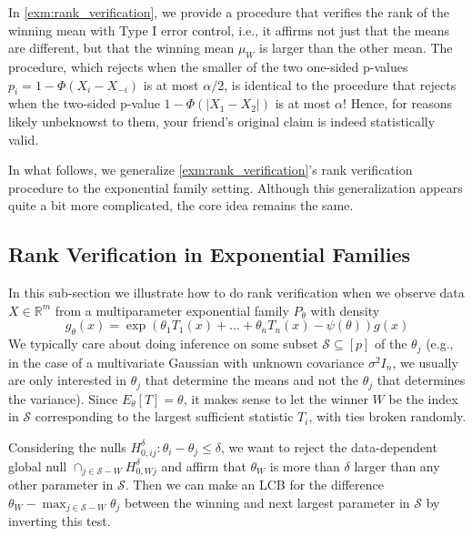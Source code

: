 \documentclass{article}
\newcommand{\R}{\mathbb{R}}
\begin{document}
In \eqref{exm:rank_verification}, we provide a procedure that verifies the rank of the winning mean with Type I error control, i.e., it affirms not just that the means are different, but that the winning mean $\mu_W$ is larger than the other mean.  The procedure, which rejects when the smaller of the two one-sided p-values $p_i = 1 - \Phi(X_i - X_{-i})$ is at most $\alpha/2$, is identical to the procedure that rejects when the two-sided p-value $1 - \Phi(|X_1 - X_2|)$ is at most $\alpha$! Hence, for reasons likely unbeknowst to them, your friend's original claim is indeed statistically valid. 

In what follows, we generalize \eqref{exm:rank_verification}'s rank verification procedure to the exponential family setting. Although this generalization appears quite a bit more complicated, the core idea remains the same. 

\subsection{Rank Verification in Exponential Families}

In this sub-section we illustrate how to do rank verification when we observe data $X \in \R^m$ from a multiparameter exponential family $P_{\theta}$ with density
\begin{equation}
    \label{eq:exp_fam}
    g_{\theta}(x) = \exp(\theta_1 T_1(x) + \dots + \theta_n T_n(x) - \psi(\theta))g(x)
\end{equation}
We typically care about doing inference on some subset $\mathcal{S} \subseteq [p]$ of the $\theta_j$ (e.g., in the case of a multivariate Gaussian with unknown covariance $\sigma^2I_n$, we usually are only interested in $\theta_j$ that determine the means and not the $\theta_j$ that determines the variance). Since $E_{\theta}[T] = \theta$, it makes sense to let the winner $W$ be the index in $\mathcal{S}$ corresponding to the largest sufficient statistic $T_i$, with ties broken randomly.

Considering the nulls $H^{\delta}_{0, ij} : \theta_i - \theta_j \leq \delta $, we want to reject the data-dependent global null $\cap_{j \in \mathcal{S} - W} H^{\delta}_{0, Wj} $ and affirm that $\theta_W$ is more than $\delta$ larger than any other parameter in $\mathcal{S}$. Then we can make an LCB for the difference $\theta_W - \max_{j \in \mathcal{S} - W } \theta_j$ between the winning and next largest parameter in $\mathcal{S}$ by inverting this test. 
\end{document}
